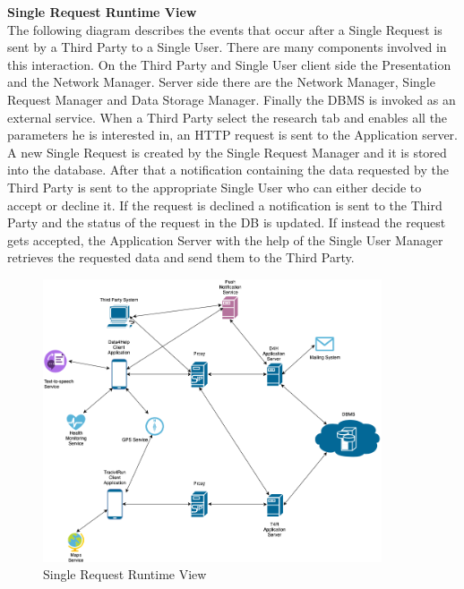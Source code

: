 \documentclass[titlepage]{article}
\begin{document}
{\bf Single Request Runtime View }\\ 
The following diagram describes the events that occur after a Single Request is sent by a Third Party to a Single User. There are many components involved in this interaction. On the Third Party and Single User client side the Presentation and the Network Manager. Server side there are the Network Manager, Single Request Manager and Data Storage Manager. Finally the DBMS is invoked as an external service.
When a Third Party select the research tab and enables all the parameters he is interested in, an HTTP request is sent to the Application server. A new Single Request is created by the Single Request Manager and it is stored into the database. After that a notification containing the data requested by the Third Party is sent to the appropriate Single User who can either decide to accept or decline it. If the request is declined a notification is sent to the Third Party and the status of the request in the DB is updated. If instead the request gets accepted, the Application Server with the help of the Single User Manager retrieves the requested data and send them to the Third Party.

\begin{figure}[H]
	\center
  	\includegraphics[width=10cm]{Overview.png} %
  	\caption{Single Request Runtime View}
 	\label{fig:SIGREQ}
\end{figure}
\end{document}
